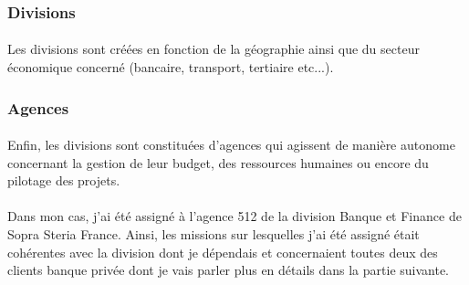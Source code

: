 \subsubsection{Divisions}
\paragraph{}
Les divisions sont créées en fonction de la géographie ainsi que du secteur économique concerné (bancaire, transport, tertiaire etc...).

\subsubsection{Agences}
\paragraph{}
Enfin, les divisions sont constituées d'agences qui agissent de manière autonome concernant la gestion de leur budget, des ressources humaines ou encore du pilotage des projets.

\paragraph{}
Dans mon cas, j'ai été assigné à l'agence 512 de la division Banque et Finance de Sopra Steria France. Ainsi, les missions sur lesquelles j'ai été assigné était cohérentes avec la division dont je dépendais et concernaient toutes deux des clients banque privée dont je vais parler plus en détails dans la partie suivante.